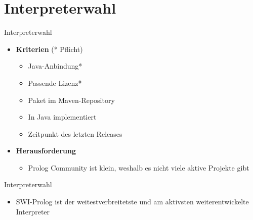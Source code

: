 \documentclass[18pt]{beamer}
\begin{document}
\section{Interpreterwahl}
\begin{frame}{Interpreterwahl}
\begin{itemize}
\item \textbf{Kriterien} (* Pflicht)
\begin{itemize}
\item Java-Anbindung*
\item Passende Lizenz*
\item Paket im Maven-Repository
\item In Java implementiert
\item Zeitpunkt des letzten Releases
\end{itemize}
\vspace{0.5cm}
\item \textbf{Herausforderung}
\begin{itemize}
\item Prolog Community ist klein, weshalb es nicht viele aktive Projekte gibt
\end{itemize}
\end{itemize}
\end{frame}
\begin{frame}{Interpreterwahl}
\begin{table}[]
\end{table}
\vspace{0.5cm}
\begin{itemize}
\item SWI-Prolog ist der weitestverbreitetste und am aktivsten weiterentwickelte Interpreter
\end{itemize}
\end{frame}
\end{document}
